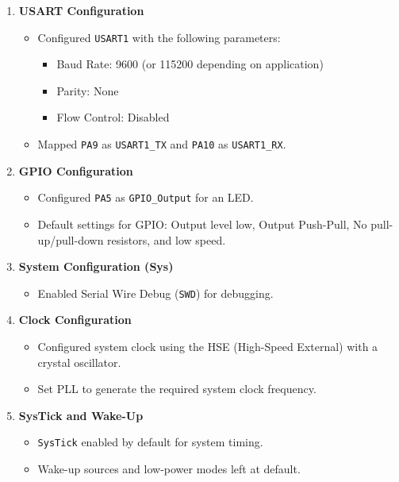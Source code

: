 \documentclass{article}
\begin{document}
\begin{enumerate}
    \item \textbf{USART Configuration}
    \begin{itemize}
        \item Configured \texttt{USART1} with the following parameters:
        \begin{itemize}
            \item Baud Rate: 9600 (or 115200 depending on application)
            \item Parity: None
            \item Flow Control: Disabled
        \end{itemize}
        \item Mapped \texttt{PA9} as \texttt{USART1\_TX} and \texttt{PA10} as \texttt{USART1\_RX}.
    \end{itemize}

    \item \textbf{GPIO Configuration}
    \begin{itemize}
        \item Configured \texttt{PA5} as \texttt{GPIO\_Output} for an LED.
        \item Default settings for GPIO: Output level low, Output Push-Pull, No pull-up/pull-down resistors, and low speed.
    \end{itemize}

    \item \textbf{System Configuration (Sys)} 
    \begin{itemize}
        \item Enabled Serial Wire Debug (\texttt{SWD}) for debugging.
    \end{itemize}

    \item \textbf{Clock Configuration}
    \begin{itemize}
        \item Configured system clock using the HSE (High-Speed External) with a crystal oscillator.
        \item Set PLL to generate the required system clock frequency.
    \end{itemize}

    \item \textbf{SysTick and Wake-Up}
    \begin{itemize}
        \item \texttt{SysTick} enabled by default for system timing.
        \item Wake-up sources and low-power modes left at default.
    \end{itemize}


\end{enumerate}
\end{document}
